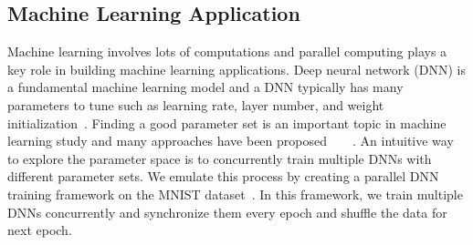 \documentclass[conference]{IEEEtran}
\begin{document}
\subsection{Machine Learning Application}
Machine learning involves lots of computations and parallel computing plays a key role 
in building machine learning applications.
Deep neural network (DNN) is a fundamental machine learning model and a DNN
typically has many parameters to tune such as learning
rate, layer number, and weight initialization~\cite{Hyperparameter_2013}. 
Finding a good parameter set is an important topic
in machine learning study and many approaches have been 
proposed~\cite{Hyperparameter_2013}~\cite{random_search}~\cite{bayesian_search}~\cite{grid_search}.
An intuitive way to explore the parameter space is to concurrently train
multiple DNNs with different parameter sets. 
We emulate this process by creating a parallel DNN training framework on the MNIST dataset~\cite{mnist}. 
In this framework, we train multiple DNNs concurrently and synchronize them 
every epoch and shuffle the data for next epoch.
\end{document}
